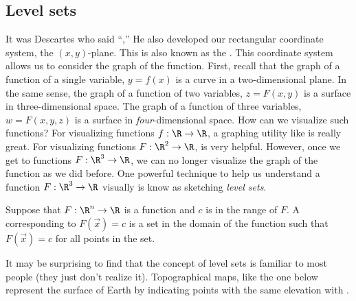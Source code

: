 \documentclass{ximera}
\begin{document}
\subsection{Level sets}

It was Descartes who said ``,'' He also
developed our rectangular coordinate system, the $(x,y)$-plane. This
is also known as the .
This coordinate system allows us to consider the graph of the
function. First, recall that the graph of a function of a single
variable, $y=f(x)$ is a curve in a two-dimensional plane.  In the same
sense, the graph of a function of two variables, $z = F(x,y)$ is a
surface in three-dimensional space. The graph of a function of three
variables, $w=F(x,y,z)$ is a surface in \textit{four}-dimensional
space. How can we visualize such functions?  For visualizing functions
$f:\R\to\R$, a graphing utility like
 is really great. For
visualizing functions $F:\R^2\to\R$,
 is very
helpful. However, once we get to functions $F:\R^3\to\R$, we can no
longer visualize the graph of the function as we did before.  One
powerful technique to help us understand a function $F:\R^3\to\R$
visually is know as sketching \textit{level sets}.


\begin{definition}
  Suppose that $F:\R^n \to \R$ is a function and $c$ is in the range
  of $F$. A  corresponding to $F(\vec{x})=c$ is a set
  in the domain of the function such that $F(\vec{x}) = c$ for all
  points in the set.
\end{definition}



It may be surprising to find that the concept of level sets is
familiar to most people (they just don't realize it).  Topographical
maps, like the one below represent the surface of Earth by
indicating points with the same elevation with .
\end{document}
